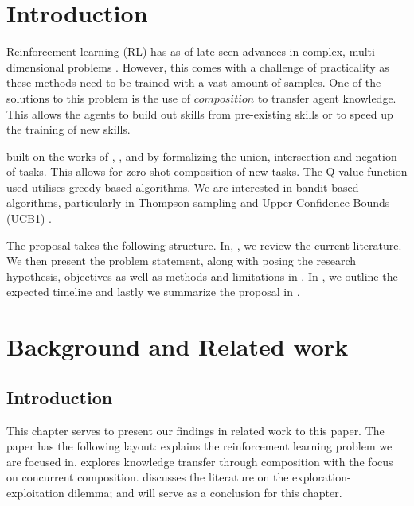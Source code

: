 \documentclass[a4paper,twoside,12pt]{report}
\begin{document}


\chapter{Introduction}
Reinforcement learning (RL) has as of late seen advances in complex, multi-dimensional problems 
\citep{mnih2015human,levine2016end,lillicrap2015continuous,silver2017mastering}. However, this comes with a challenge 
of practicality as these methods need to be trained with a vast amount of samples. One of the solutions to this problem 
is the use of $composition$ \citep*{todorov2009compositionality} to transfer agent knowledge. This allows the agents to 
build out skills from pre-existing skills or to speed up the training of new skills.

\citet*{nangue2020boolean} built on the works of \citet*{haarnoja2018composable}, \citet*{van2019composing}, and 
\citet*{hunt2019composing} by formalizing the union, intersection and negation of tasks. This allows for zero-shot
composition of new tasks. The Q-value function used utilises greedy based algorithms. We are interested in bandit based 
algorithms, particularly in Thompson sampling \citep{thompson1933likelihood} and Upper Confidence Bounds (UCB1) 
\citep{auer2002finite}.

The proposal takes the following structure. In, , we review the current literature. We then present the 
problem statement, along with posing the research hypothesis, objectives as well as methods and limitations in 
. In , we outline the expected timeline and lastly we summarize the 
proposal in .


\chapter{Background and Related work} \label{ch:review}

\section{Introduction}
This chapter serves to present our findings in related work to this paper. The paper has the following layout: 
 explains the reinforcement learning problem we are focused in. 
 explores knowledge transfer through composition with the focus on concurrent composition.
 discusses the literature on the exploration-exploitation dilemma; and 
 will serve as a conclusion for this chapter.
\end{document}
